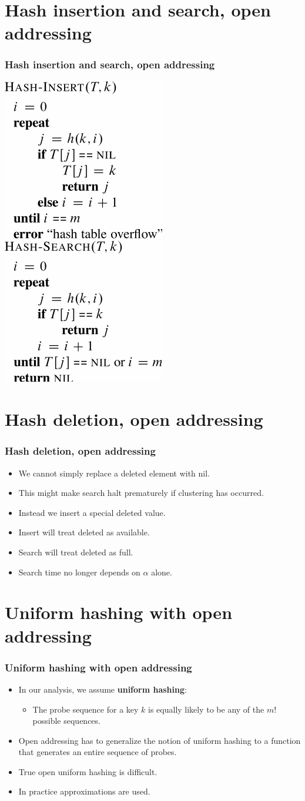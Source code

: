 \documentclass{beamer}
\newcommand{\bi}{\begin{itemize}}
\newcommand{\ii}{\item}
\newcommand{\ei}{\end{itemize}}
\newcommand{\sect}[1]{
\section{#1}
\begin{frame}[fragile]\frametitle{#1}
}
\begin{document}
\sect{Hash insertion and search, open addressing}
\includegraphics{Hash-Insert}
\hfill
\includegraphics{Hash-Search}
\end{frame}

\sect{Hash deletion, open addressing}

\bi
\item We cannot simply replace a deleted element with {\sc nil}.
\item
  This might make search halt prematurely if clustering has occurred.
\item
  Instead we insert a special {\sc deleted} value.
\item
  Insert will treat {\sc deleted} as available.
\item
  Search will treat {\sc deleted} as full.
\item
  Search time no longer depends on $\alpha$ alone.
\ei
\end{frame}

\sect{Uniform hashing with open addressing}
\bi
\ii
In our analysis, we assume {\bf uniform hashing}:
\bi\ii
The probe sequence for a key $k$
is equally likely to be any of the $m!$ possible
sequences.\ei
\ii
Open addressing has to generalize the notion of
uniform hashing to a function that generates an entire sequence of
probes.
\ii True open uniform hashing is difficult.
\ii In practice approximations are used.
\ei
\end{frame}
\end{document}
